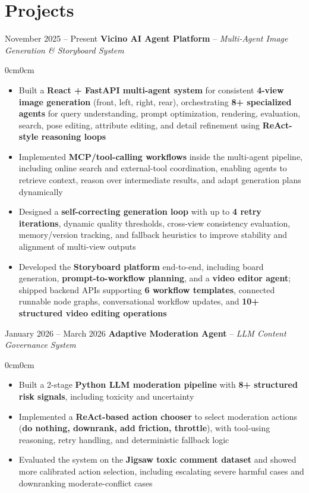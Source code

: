 \documentclass[8pt, letterpaper]{article}
\newenvironment{highlights}{
  \begin{itemize}[topsep=0.10cm,parsep=0.10cm,partopsep=0pt,itemsep=0pt,leftmargin=10pt]
}{
  \end{itemize}
}
\newenvironment{onecolentry}{
  \begin{adjustwidth}{0cm}{0cm}
}{
  \end{adjustwidth}
}
\begin{document}
\section{Projects}
\begin{twocolentryLarge}{November 2025 -- Present}
\textbf{Vicino AI Agent Platform} -- \textit{Multi-Agent Image Generation \& Storyboard System}
\end{twocolentryLarge}
\begin{onecolentry}
\begin{highlights}
  \item Built a \textbf{React + FastAPI multi-agent system} for consistent \textbf{4-view image generation} (front, left, right, rear), orchestrating \textbf{8+ specialized agents} for query understanding, prompt optimization, rendering, evaluation, search, pose editing, attribute editing, and detail refinement using \textbf{ReAct-style reasoning loops}
  \item Implemented \textbf{MCP/tool-calling workflows} inside the multi-agent pipeline, including online search and external-tool coordination, enabling agents to retrieve context, reason over intermediate results, and adapt generation plans dynamically
  \item Designed a \textbf{self-correcting generation loop} with up to \textbf{4 retry iterations}, dynamic quality thresholds, cross-view consistency evaluation, memory/version tracking, and fallback heuristics to improve stability and alignment of multi-view outputs
  \item Developed the \textbf{Storyboard platform} end-to-end, including board generation, \textbf{prompt-to-workflow planning}, and a \textbf{video editor agent}; shipped backend APIs supporting \textbf{6 workflow templates}, connected runnable node graphs, conversational workflow updates, and \textbf{10+ structured video editing operations}
\end{highlights}
\end{onecolentry}
\vspace{0.3cm}
\begin{twocolentryLarge}{January 2026 -- March 2026}
\textbf{Adaptive Moderation Agent} -- \textit{LLM Content Governance System}
\end{twocolentryLarge}
\begin{onecolentry}
\begin{highlights}
  \item Built a 2-stage \textbf{Python LLM moderation pipeline} with \textbf{8+ structured risk signals}, including toxicity and uncertainty
  \item Implemented a \textbf{ReAct-based action chooser} to select moderation actions (\textbf{do nothing, downrank, add friction, throttle}), with tool-using reasoning, retry handling, and deterministic fallback logic
  \item Evaluated the system on the \textbf{Jigsaw toxic comment dataset} and showed more calibrated action selection, including escalating severe harmful cases and downranking moderate-conflict cases
\end{highlights}
\end{onecolentry}
\end{document}
